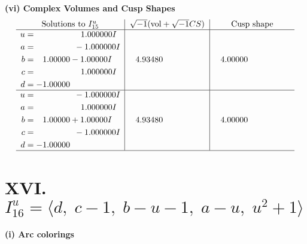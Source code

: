 \documentclass[1p]{elsarticle_modified}
\theoremstyle{definition}
\newcommand{\I}{\sqrt{-1}}
\begin{document}
\newpage\flushleft \textbf{(vi) Complex Volumes and Cusp Shapes}
$$\begin{array}{c|c|c}  
\text{Solutions to }I^u_{15}& \I (\text{vol} + \sqrt{-1}CS) & \text{Cusp shape}\\
 \hline 
\begin{aligned}
u &= \phantom{-0.000000 -}1.000000 I \\
a &= \phantom{-0.000000 } -1.000000 I \\
b &= \phantom{-}1.00000 - 1.00000 I \\
c &= \phantom{-0.000000 -}1.000000 I \\
d &= -1.00000\phantom{ +0.000000I}\end{aligned}
 & \phantom{-}4.93480\phantom{ +0.000000I} & \phantom{-}4.00000\phantom{ +0.000000I} \\ \hline\begin{aligned}
u &= \phantom{-0.000000 } -1.000000 I \\
a &= \phantom{-0.000000 -}1.000000 I \\
b &= \phantom{-}1.00000 + 1.00000 I \\
c &= \phantom{-0.000000 } -1.000000 I \\
d &= -1.00000\phantom{ +0.000000I}\end{aligned}
 & \phantom{-}4.93480\phantom{ +0.000000I} & \phantom{-}4.00000\phantom{ +0.000000I}\\
 \hline 
 \end{array}$$\newpage\newpage\renewcommand{\arraystretch}{1}
\centering \section*{XVI. $I^u_{16}= \langle d,\;c-1,\;b- u-1,\;a- u,\;u^2+1 \rangle$}
\flushleft \textbf{(i) Arc colorings}\\
\end{document}
